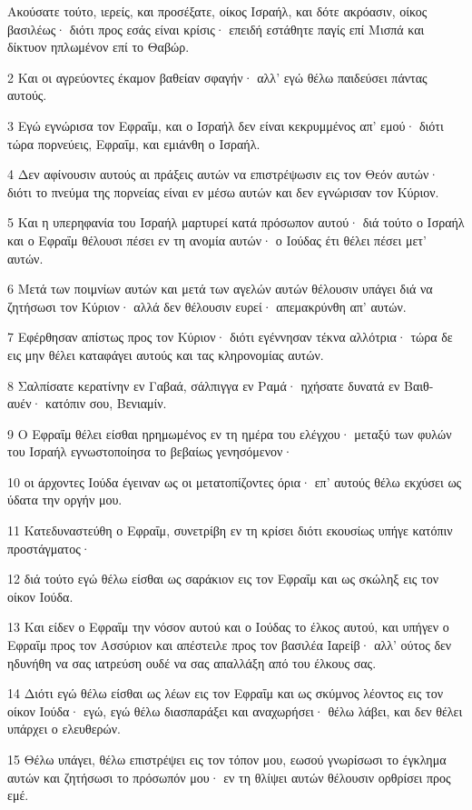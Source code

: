 \par Ακούσατε τούτο, ιερείς, και προσέξατε, οίκος Ισραήλ, και δότε ακρόασιν, οίκος βασιλέως· διότι προς εσάς είναι κρίσις· επειδή εστάθητε παγίς επί Μισπά και δίκτυον ηπλωμένον επί το Θαβώρ.
\par 2 Και οι αγρεύοντες έκαμον βαθείαν σφαγήν· αλλ' εγώ θέλω παιδεύσει πάντας αυτούς.
\par 3 Εγώ εγνώρισα τον Εφραΐμ, και ο Ισραήλ δεν είναι κεκρυμμένος απ' εμού· διότι τώρα πορνεύεις, Εφραΐμ, και εμιάνθη ο Ισραήλ.
\par 4 Δεν αφίνουσιν αυτούς αι πράξεις αυτών να επιστρέψωσιν εις τον Θεόν αυτών· διότι το πνεύμα της πορνείας είναι εν μέσω αυτών και δεν εγνώρισαν τον Κύριον.
\par 5 Και η υπερηφανία του Ισραήλ μαρτυρεί κατά πρόσωπον αυτού· διά τούτο ο Ισραήλ και ο Εφραΐμ θέλουσι πέσει εν τη ανομία αυτών· ο Ιούδας έτι θέλει πέσει μετ' αυτών.
\par 6 Μετά των ποιμνίων αυτών και μετά των αγελών αυτών θέλουσιν υπάγει διά να ζητήσωσι τον Κύριον· αλλά δεν θέλουσιν ευρεί· απεμακρύνθη απ' αυτών.
\par 7 Εφέρθησαν απίστως προς τον Κύριον· διότι εγέννησαν τέκνα αλλότρια· τώρα δε εις μην θέλει καταφάγει αυτούς και τας κληρονομίας αυτών.
\par 8 Σαλπίσατε κερατίνην εν Γαβαά, σάλπιγγα εν Ραμά· ηχήσατε δυνατά εν Βαιθ-αυέν· κατόπιν σου, Βενιαμίν.
\par 9 Ο Εφραΐμ θέλει είσθαι ηρημωμένος εν τη ημέρα του ελέγχου· μεταξύ των φυλών του Ισραήλ εγνωστοποίησα το βεβαίως γενησόμενον·
\par 10 οι άρχοντες Ιούδα έγειναν ως οι μετατοπίζοντες όρια· επ' αυτούς θέλω εκχύσει ως ύδατα την οργήν μου.
\par 11 Κατεδυναστεύθη ο Εφραΐμ, συνετρίβη εν τη κρίσει διότι εκουσίως υπήγε κατόπιν προστάγματος·
\par 12 διά τούτο εγώ θέλω είσθαι ως σαράκιον εις τον Εφραΐμ και ως σκώληξ εις τον οίκον Ιούδα.
\par 13 Και είδεν ο Εφραΐμ την νόσον αυτού και ο Ιούδας το έλκος αυτού, και υπήγεν ο Εφραΐμ προς τον Ασσύριον και απέστειλε προς τον βασιλέα Ιαρείβ· αλλ' ούτος δεν ηδυνήθη να σας ιατρεύση ουδέ να σας απαλλάξη από του έλκους σας.
\par 14 Διότι εγώ θέλω είσθαι ως λέων εις τον Εφραΐμ και ως σκύμνος λέοντος εις τον οίκον Ιούδα· εγώ, εγώ θέλω διασπαράξει και αναχωρήσει· θέλω λάβει, και δεν θέλει υπάρχει ο ελευθερών.
\par 15 Θέλω υπάγει, θέλω επιστρέψει εις τον τόπον μου, εωσού γνωρίσωσι το έγκλημα αυτών και ζητήσωσι το πρόσωπόν μου· εν τη θλίψει αυτών θέλουσιν ορθρίσει προς εμέ.

